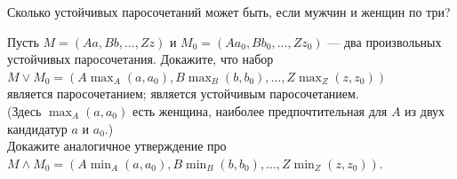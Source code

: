 \documentclass[a4paper,11pt]{article}
\begin{document}
 Сколько устойчивых паросочетаний может быть, если мужчин и женщин по три?

 Пусть $M = (Aa, Bb, \ldots , Zz)$ и $M_0 = (Aa_0, Bb_0,\ldots , Zz_0)$ --- два произвольных устойчивых паросочетания. Докажите, что набор
$M \vee M_0 = (A \max_A(a,a_0), B \max_B(b,b_0),\ldots, Z \max_Z(z,z_0))$\\  является паросочетанием;  является устойчивым паросочетанием.
\\
(Здесь $\max_A(a, a_0)$ есть женщина, наиболее предпочтительная для $A$ из двух кандидатур $a$ и $a_0$.)
\\ Докажите аналогичное утверждение про $M \wedge M_0 = (A \min_A(a,a_0), B \min_B(b,b_0),\ldots, Z \min_Z(z,z_0))$.



\end{document}
